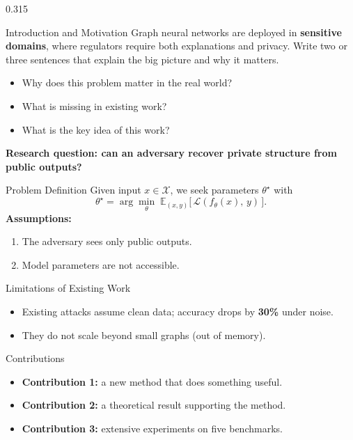 \documentclass[final]{beamer}
\newcommand{\kw}[1]{\textbf{\textcolor{Primary}{#1}}}     %
\newcommand{\num}[1]{\textbf{\textcolor{Accent}{#1}}}     %
\begin{document}
\begin{frame}[t]
\begin{columns}[T,onlytextwidth]
\begin{column}{0.315\textwidth}

\begin{block}{Introduction and Motivation}
  Graph neural networks are deployed in \kw{sensitive domains}, where regulators
  require both explanations and privacy. Write two or three sentences that
  explain the big picture and why it matters.
  \begin{itemize}
    \item Why does this problem matter in the real world?
    \item What is missing in existing work?
    \item What is the key idea of this work?
  \end{itemize}
  \begin{tcolorbox}[keybox]
    \centering\bfseries Research question: can an adversary recover private
    structure from public outputs?
  \end{tcolorbox}
\end{block}

\begin{block}{Problem Definition}
  Given input $x \in \mathcal{X}$, we seek parameters $\theta^{\star}$ with
  \[
    \theta^{\star} = \arg\min_{\theta}\;
    \mathbb{E}_{(x,y)}\big[\,\mathcal{L}(f_\theta(x),\,y)\,\big].
  \]
  \textbf{Assumptions:}
  \begin{enumerate}
    \item The adversary sees only public outputs.
    \item Model parameters are not accessible.
  \end{enumerate}
\end{block}

\begin{alertblock}{Limitations of Existing Work}
  \begin{itemize}
    \item Existing attacks assume clean data; accuracy drops by \num{30\%} under noise.
    \item They do not scale beyond small graphs (out of memory).
  \end{itemize}
\end{alertblock}

\begin{block}{Contributions}
  \begin{itemize}
    \item \kw{Contribution 1:} a new method that does something useful.
    \item \kw{Contribution 2:} a theoretical result supporting the method.
    \item \kw{Contribution 3:} extensive experiments on five benchmarks.
  \end{itemize}
\end{block}


\end{column}
\end{columns}
\end{frame}
\end{document}
